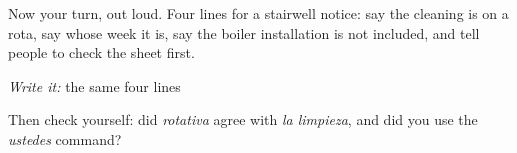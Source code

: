 \begin{tcolorbox}[breakable,colback=teal!4,colframe=teal!35!black,title={Before you move on}]
Now your turn, out loud. Four lines for a stairwell notice: say the cleaning is on a rota, say whose week it is, say the boiler installation is not included, and tell people to check the sheet first.

\emph{Write it:} the same four lines

Then check yourself: did \emph{rotativa} agree with \emph{la limpieza}, and did you use the \emph{ustedes} command?
\end{tcolorbox}

